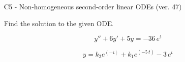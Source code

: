 \begin{exercise}
  \begin{exerciseTitle}C5 - Non-homogeneous second-order linear ODEs (ver. 47)\end{exerciseTitle}
  \begin{exerciseStatement}
    
Find the solution to the given ODE.

    
\[y''+6y'+5y = -36 \, e^{t}\]

  \end{exerciseStatement}
  \begin{exerciseAnswer}
    
\[y= k_{2} e^{\left(-t\right)} + k_{1} e^{\left(-5 \, t\right)} - 3 \, e^{t}\]

  \end{exerciseAnswer}
\end{exercise}